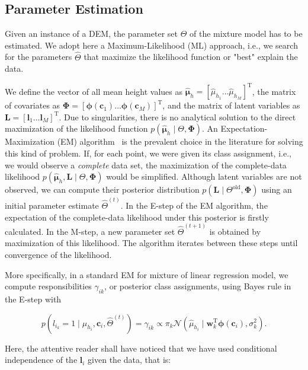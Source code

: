 \subsection{Parameter Estimation}

Given an instance of a DEM, the parameter set $\Theta$ of the mixture model has
to be estimated. We adopt here a Maximum-Likelihood (ML) approach, i.e., we
search for the parameters $\hat{\Theta}$ that maximize the likelihood function
or "best" explain the data.

We define the vector of all mean height values as $\hat{\boldsymbol\mu}_h=
[\hat{\mu}_{h_1}\dots\hat{\mu}_{h_M}]^\text{T}$, the matrix of covariates as
$\boldsymbol{\Phi}=[\boldsymbol{\phi}(\mathbf{c}_1)\dots\boldsymbol{\phi}
(\mathbf{c}_{M})]^\text{T}$, and the matrix of latent variables as
$\mathbf{L}=[\mathbf{l}_1\dots\mathbf{l}_M]^\text{T}$. Due to singularities,
there is no analytical solution to the direct maximization of the likelihood
function $p(\hat{\boldsymbol\mu}_h\mid\Theta,\boldsymbol{\Phi})$. An
Expectation-Maximization (EM) algorithm~\cite{dempster77maximum} is the
prevalent choice in the literature for solving this kind of problem. If, for
each point, we were given its class assignment, i.e., we would observe a
\emph{complete} data set, the maximization of the complete-data likelihood
$p(\hat{\boldsymbol\mu}_h,\mathbf{L}\mid\Theta,\boldsymbol{\Phi})$ would be
simplified. Although latent variables are not observed, we can compute their
posterior distribution $p(\mathbf{L}\mid\Theta^\text{old},\boldsymbol{\Phi})$
using an initial parameter estimate $\hat{\Theta}^{(t)}$. In the E-step of
the EM algorithm, the expectation of the complete-data likelihood under this
posterior is firstly calculated. In the M-step, a new parameter set
$\hat{\Theta}^{(t+1)}$ is obtained by maximization of this likelihood.
The algorithm iterates between these steps until convergence of the likelihood.

More specifically, in a standard EM for mixture of linear regression model, we
compute responsibilities $\gamma_{ik}$, or posterior class assignments, using
Bayes rule in the E-step with

\begin{equation}
\label{eqn:responsibility}
p(l_{i_k}=1\mid\hat{\mu}_{h_i},\mathbf{c}_i,\hat{\Theta}^{(t)})=\gamma_{ik}
\propto\pi_k\mathcal{N}(\hat{\mu}_{h_i}\mid\mathbf{w}_k^\text{T}
\boldsymbol{\phi}(\mathbf{c}_i),\sigma^2_k).
\end{equation}

Here, the attentive reader shall have noticed that we have used conditional
independence of the $\mathbf{l}_i$ given the data, that is:

